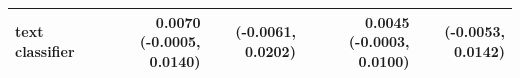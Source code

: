 \begin{tabular}{lrrrr}
text classifier & 0.0070 (-0.0005, 0.0140) & (-0.0061, 0.0202) & 0.0045 (-0.0003, 0.0100) & (-0.0053, 0.0142) \\
\bottomrule
\end{tabular}
